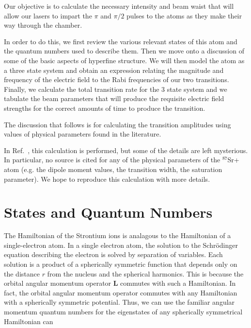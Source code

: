 Our objective is to calculate the necessary intensity and beam waist that will allow our lasers to impart the $\pi$ and $\pi/2$ pulses to the atoms as they make their way through the chamber. 

In order to do this, we first review the various relevant states of this atom and the quantum numbers used to describe them. Then we move onto a discussion of some of the basic aspects of hyperfine structure. We will then model the atom as a three state system and obtain an expression relating the magnitude and frequency of the electric field to the Rabi frequencies of our two transitions. Finally, we calculate the total transition rate for the 3 state system and we tabulate the beam parameters that will produce the requisite electric field strengths for the correct amounts of time to produce the transition.

The discussion that follows is for calculating the transition amplitudes using values of physical parameters found in the literature.

In Ref.\ \cite{cjeDiss}, this calculation is performed, but some of the details are left mysterious. In particular, no source is cited for any of the physical parameters of the $^{87}$Sr+ atom (e.g. the dipole moment values, the transition width, the saturation parameter). We hope to reproduce this calculation with more details.  

\section{States and Quantum Numbers}

The Hamiltonian of the Strontium ions is analagous to the Hamiltonian of a single-electron atom. 
In a single electron atom, the solution to the Schr\"odinger equation describing the electron is solved by separation of variables.
 Each solution is a product of a spherically symmetric function that depends only on the distance $r$ from the nucleus and the spherical harmonics.
This is because the orbital angular momentum operator $\mathbf{L}$ commutes with such a Hamiltonian. In fact, the orbital angular momentum operator commutes with any Hamiltonian with a spherically symmetric potential.
Thus, we can use the familiar angular momentum quantum numbers for the eigenstates of any spherically symmetrical Hamiltonian can 

